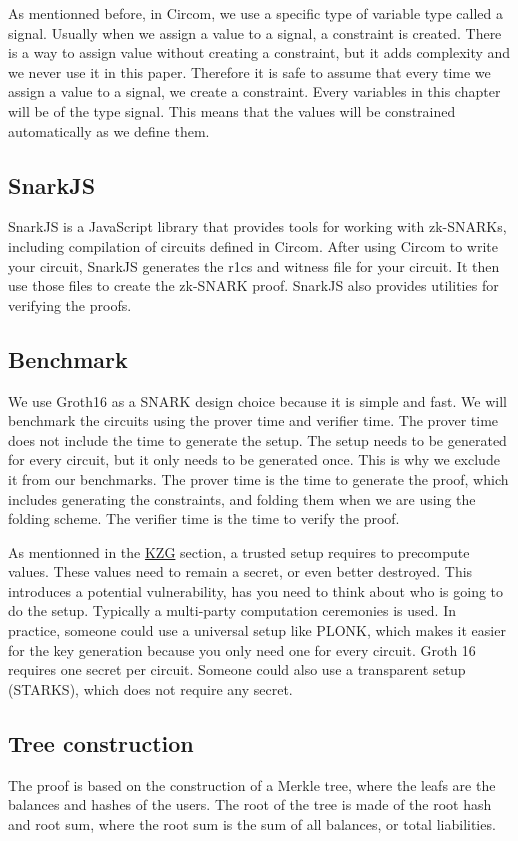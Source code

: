 As mentionned before, in Circom, we use a specific type of variable type called a signal. Usually when we assign a value to a signal, a constraint is created.
There is a way to assign value without creating a constraint, but it adds complexity and we never use it in this paper. 
Therefore it is safe to assume that every time we assign a value to a signal, we create a constraint. 
Every variables in this chapter will be of the type signal.
This means that the values will be constrained automatically as we define them. 
\subsection{SnarkJS} 

SnarkJS is a JavaScript library that provides tools for working with zk-SNARKs, including compilation of circuits defined in Circom. 
After using Circom to write your circuit, SnarkJS generates the r1cs and witness file for your circuit. It then use those files to create the zk-SNARK proof.
SnarkJS also provides utilities for verifying the proofs.

\subsection{Benchmark} 
We use Groth16 as a SNARK design choice because it is simple and fast. 
We will benchmark the circuits using the prover time and verifier time. The prover time does not include the time to generate the setup.
The setup needs to be generated for every circuit, but it only needs to be generated once. This is why we exclude it from our benchmarks.
The prover time is the time to generate the proof, which includes generating the constraints, and folding them when we are using the folding scheme. 
The verifier time is the time to verify the proof.

As mentionned in the \hyperref[subsec:plc]{KZG} section, a trusted setup requires to precompute values. These values need to remain a secret, or even better destroyed.
This introduces a potential vulnerability, has you need to think about who is going to do the setup. Typically a multi-party computation ceremonies is used.
In practice, someone could use a universal setup like PLONK, which makes it easier for the key generation because you only need one for every circuit. Groth 16 requires one secret per circuit.
Someone could also use a transparent setup (STARKS), which does not require any secret.

\subsection{Tree construction}
The proof is based on the construction of a Merkle tree, where the leafs are the balances and hashes of the users. The root of the tree is made of the root hash and root sum, where the root sum is the sum of all balances, or total liabilities.

